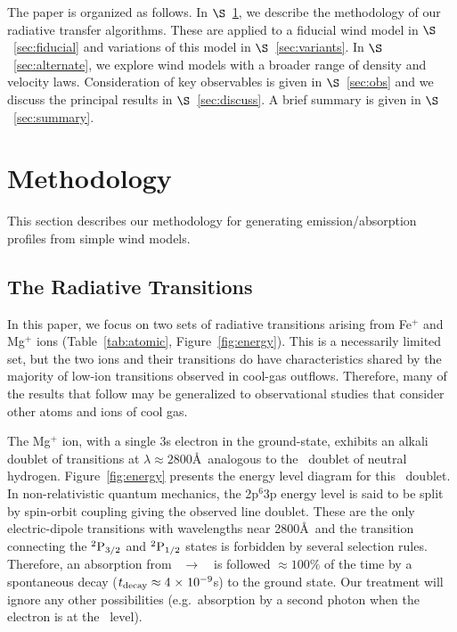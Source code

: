 \documentclass[12pt,preprint]{aastex}
\begin{document}
The paper is organized as follows.  In $\S$~\ref{sec:method}, we
describe the methodology of our radiative transfer algorithms.  These
are applied to a fiducial wind model in $\S$~\ref{sec:fiducial} and
variations of this model in $\S$~\ref{sec:variants}.  In
$\S$~\ref{sec:alternate}, we explore wind models with a broader range
of density and velocity laws.  Consideration of key observables is
given in $\S$~\ref{sec:obs} and we discuss the principal results
in $\S$~\ref{sec:discuss}.  A brief summary is given in
$\S$~\ref{sec:summary}.

\section{Methodology}
\label{sec:method}

This section describes our methodology for generating
emission/absorption profiles from simple wind models.

\subsection{The Radiative Transitions}

In this paper, we focus on two sets of radiative transitions
arising from Fe$^+$ and Mg$^+$ ions
(Table~\ref{tab:atomic}, Figure~\ref{fig:energy}).
This is a necessarily limited
set, but the two ions and their transitions do have characteristics
shared by the majority of low-ion transitions
observed in cool-gas outflows. Therefore, many
of the results that follow may be generalized to observational studies that
consider other atoms and ions of cool gas.

The Mg$^+$ ion, with a single 3s electron in the ground-state,
exhibits an alkali doublet of transitions at $\lambda \approx
2800$\AA\ analogous to the
\lya\ doublet of neutral hydrogen.  Figure~\ref{fig:energy}
presents the energy level diagram for this 
\mgiid\ doublet.  In non-relativistic quantum
mechanics, the 2p$^6$3p energy level is said to be split by spin-orbit
coupling giving the observed line doublet.  These are the only
 electric-dipole transitions 
with wavelengths near 2800\AA\ and the transition connecting
the $\rm {}^2P_{3/2}$ and $\rm {}^2P_{1/2}$ states is forbidden by several
selection rules.  Therefore, an absorption from
\maconfig~$\to$~\mbconfig\
is followed $\approx 100\%$ of the time by a spontaneous decay
($t_{\rm decay} \approx 4{\; \times \; 10^{-9}}$s) to the
ground state. Our treatment will ignore any other possibilities
(e.g.\ absorption by a second photon when the electron is at the \mbconfig\ level).
\end{document}
